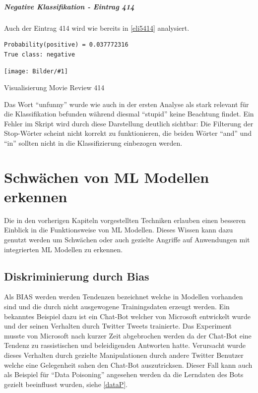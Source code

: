 \documentclass[
  12pt, %
  a4paper, %
  oneside, %
  openany, 
  numbers=noenddot, %
  BCOR=5mm, %
  parskip=half*, %
  thesis, %
]{bfhbook}
\newcommand{\imgText}[3]{
\begin{center}
    \begin{minipage}[t]{0.6\textwidth}
    		\vspace{0pt}
		\texttt{[image: Bilder/\#1]}
		\caption{#2}
	\end{minipage}\hfill
    \begin{minipage}[t]{0.4\textwidth}
    		\vspace{5pt}
  		#3
    \end{minipage}
\end{center}
}
\begin{document}
\paragraph*{Negative Klassifikation - Eintrag 414}
Auch der Eintrag 414 wird wie bereits in \ref{eli5414} analysiert.
\begin{lstlisting}
Probability(positive) = 0.037772316
True class: negative
\end{lstlisting}
\imgText{MovieReview-LSTM-Display-414.PNG}{Visualisierung Movie Review 414}{
Das Wort ``unfunny'' wurde wie auch in der ersten Analyse als stark relevant für die Klassifikation befunden während diesmal ``stupid'' keine Beachtung findet. Ein Fehler im Skript wird durch diese Darstellung deutlich sichtbar: Die Filterung der Stop-Wörter scheint nicht korrekt zu funktionieren, die beiden Wörter ``and'' und ``in'' sollten nicht in die Klassifizierung einbezogen werden.
}

\chapter{Schwächen von ML Modellen erkennen}
Die in den vorherigen Kapiteln vorgestellten Techniken erlauben einen besseren Einblick in die Funktionsweise von \Gls{ML} Modellen. Dieses Wissen kann dazu genutzt werden um Schwächen oder auch gezielte Angriffe auf Anwendungen mit integrierten \Gls{ML} Modellen zu erkennen.

\section{Diskriminierung durch Bias}
Als \Gls{BIAS} werden werden Tendenzen bezeichnet welche in Modellen vorhanden sind und die durch nicht ausgewogene Trainingsdaten erzeugt werden.
Ein bekanntes Beispiel dazu ist ein Chat-Bot welcher von Microsoft entwickelt wurde und der seinen Verhalten durch Twitter Tweets trainierte. Das Experiment musste von Microsoft nach kurzer Zeit abgebrochen werden da der Chat-Bot eine Tendenz zu rassistischen und beleidigenden Antworten hatte. Verursacht wurde dieses Verhalten durch gezielte Manipulationen durch andere Twitter Benutzer welche eine Gelegenheit sahen den Chat-Bot auszutricksen. \parencite{msTay} 
Dieser Fall kann auch als Beispiel für ``Data Poisoning'' angesehen werden da die Lerndaten des Bots gezielt beeinflusst wurden, siehe \ref{dataP}.
\end{document}
